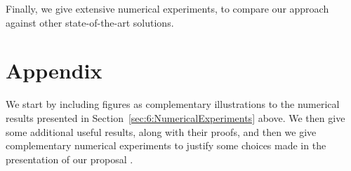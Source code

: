 %
Finally, we give extensive numerical experiments, to compare our approach against other state-of-the-art solutions.

\minitoc

\newpage


\graphicspath{{2-Chapters/6-Chapter/Images/}}










\newpage
\section{Appendix}
\label{sec:6:appendix}

We start by including figures as complementary illustrations to the numerical results presented in Section~\ref{sec:6:NumericalExperiments} above.
We then give some additional useful results, along with their proofs, and then we give complementary numerical experiments to justify some choices made in the presentation of our proposal \GLRklUCB.


